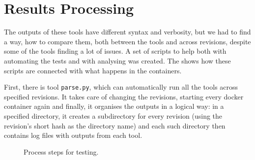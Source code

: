 \section{Results Processing}\label{chap:techniques:processing}
The outputs of these tools have different syntax and verbosity, but we had to
find a way, how to compare them, both between the tools and across revisions,
     despite some of the tools finding a lot of issues. A set of
     scripts to help both with automating the tests and with analysing was
     created. The  shows how these scripts are
     connected with what happens in the containers.

First, there is tool {\tt parse.py}, which can automatically run all the tools
across specified revisions. It takes care of changing the revisions, starting
every docker container again and finally, it organises the outputs in a logical
way: in a specified directory, it creates a subdirectory for every revision
(using the revision's short hash as the directory name) and each such directory
then contains log files with outputs from each tool.

\begin{figure}
\caption{Process steps for testing.}
\label{fig:techniques:steps}
\end{figure}

